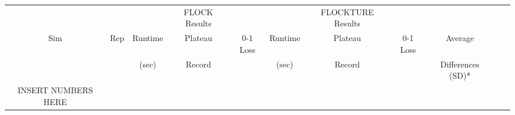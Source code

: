 \documentclass[varwidth=true, border={0, 15}]{standalone}
\begin{document}


\begin{table}[htbp]
    \centering
    \begin{tabular}{ccccccccccc}
         &&&FLOCK Results&&&FLOCKTURE Results&&\\
         Sim& Rep & Runtime & Plateau & 0-1 Loss & Runtime & Plateau& 0-1 Loss & Average\\
        & &(sec)&Record&&(sec)&Record&&Differences (SD)* \\ \hline
         INSERT NUMBERS HERE
       \end{tabular}
\end{table}
\end{document}
